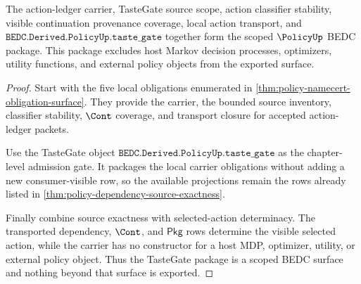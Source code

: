\begin{theorem}
\label{thm:policy-tastegate-scoped-package}
The action-ledger carrier, TasteGate source scope, action classifier stability,
visible continuation provenance coverage, local action transport, and
$\texttt{BEDC.Derived.PolicyUp.taste\_gate}$ together form the scoped
$\PolicyUp$ BEDC package. This package excludes host Markov decision processes,
optimizers, utility functions, and external policy objects from the exported
surface.
\end{theorem}
\begin{proof}
Start with the five local obligations enumerated in
\autoref{thm:policy-namecert-obligation-surface}. They provide the carrier, the
bounded source inventory, classifier stability, $\Cont$ coverage, and transport
closure for accepted action-ledger packets.

Use the TasteGate object
$\texttt{BEDC.Derived.PolicyUp.taste\_gate}$ as the chapter-level admission
gate. It packages the local carrier obligations without adding a new
consumer-visible row, so the available projections remain the rows already
listed in \autoref{thm:policy-dependency-source-exactness}.

Finally combine source exactness with selected-action determinacy. The
transported dependency, $\Cont$, and $\mathsf{Pkg}$ rows determine the visible
selected action, while the carrier has no constructor for a host MDP,
optimizer, utility, or external policy object. Thus the TasteGate package is a
scoped BEDC surface and nothing beyond that surface is exported.
\end{proof}

